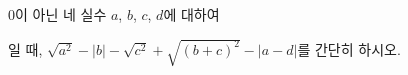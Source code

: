 $0$이 아닌 네 실수 $a$, $b$, $c$, $d$에 대하여\par\smallskip{}\par\smallskip\noindent 일 때, $\sqrt{a^2}-|b|-\sqrt{c^2}+\sqrt{(b+c)^2}-|a-d|$를 간단히 하시오.
